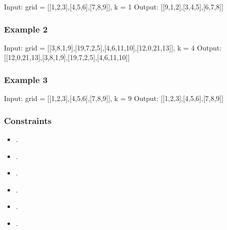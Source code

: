 \documentclass[letterpaper,12pt,english]{book}
\begin{document}
\begin{sphinxVerbatim}[commandchars=\\\{\}]
Input: grid = [[1,2,3],[4,5,6],[7,8,9]], k = 1
Output: [[9,1,2],[3,4,5],[6,7,8]]
\end{sphinxVerbatim}


\subsubsection{Example 2}
\label{\detokenize{Array/01_ARR_1260_Shift_2D_Grid:example-2}}
\sphinxAtStartPar
{}

\begin{sphinxVerbatim}[commandchars=\\\{\}]
Input: grid = [[3,8,1,9],[19,7,2,5],[4,6,11,10],[12,0,21,13]], k = 4
Output: [[12,0,21,13],[3,8,1,9],[19,7,2,5],[4,6,11,10]]
\end{sphinxVerbatim}


\subsubsection{Example 3}
\label{\detokenize{Array/01_ARR_1260_Shift_2D_Grid:example-3}}
\begin{sphinxVerbatim}[commandchars=\\\{\}]
Input: grid = [[1,2,3],[4,5,6],[7,8,9]], k = 9
Output: [[1,2,3],[4,5,6],[7,8,9]]
\end{sphinxVerbatim}


\subsubsection{Constraints}
\label{\detokenize{Array/01_ARR_1260_Shift_2D_Grid:constraints}}\begin{itemize}
\item {} 
\sphinxAtStartPar
{}.

\item {} 
\sphinxAtStartPar
{}.

\item {} 
\sphinxAtStartPar
{}.

\item {} 
\sphinxAtStartPar
{}.

\item {} 
\sphinxAtStartPar
{}.

\item {} 
\sphinxAtStartPar
{}.

\end{itemize}
\end{document}
